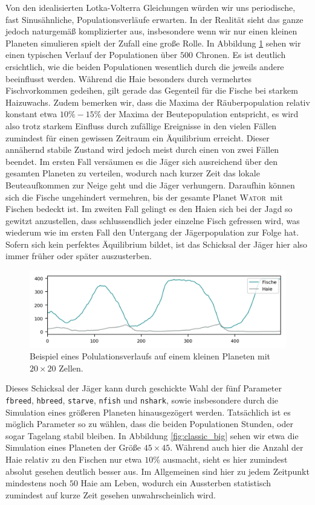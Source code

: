 \documentclass[a4paper,11pt]{article}
\newcommand{\wator}{\textsc{Wator}}
\theoremstyle{definition}
\numberwithin{equation}{section}
\begin{document}
	Von den idealisierten Lotka-Volterra Gleichungen würden wir uns periodische, fast Sinusähnliche, Populationsverläufe erwarten. In der Realität sieht das ganze jedoch naturgemäß komplizierter aus, insbesondere wenn wir nur einen kleinen Planeten simulieren spielt der Zufall eine große Rolle. In Abbildung \ref{fig:classic_default} sehen wir einen typischen Verlauf der Populationen über $500$ Chronen. Es ist deutlich ersichtlich, wie die beiden Populationen wesentlich durch die jeweils andere beeinflusst werden. Während die Haie besonders durch vermehrtes Fischvorkommen gedeihen, gilt gerade das Gegenteil für die Fische bei starkem Haizuwachs. Zudem bemerken wir, dass die Maxima der Räuberpopulation relativ konstant etwa $10\%-15\%$ der Maxima der Beutepopulation entspricht, es wird also trotz starkem Einfluss durch zufällige Ereignisse in den vielen Fällen zumindest für einen gewissen Zeitraum ein Äquilibrium erreicht. Dieser annähernd stabile Zustand wird jedoch meist durch einen von zwei Fällen beendet. Im ersten Fall versäumen es die Jäger sich ausreichend über den gesamten Planeten zu verteilen, wodurch nach kurzer Zeit das lokale Beuteaufkommen zur Neige geht und die Jäger verhungern. Daraufhin können sich die Fische ungehindert vermehren, bis der gesamte Planet \wator\ mit Fischen bedeckt ist. Im zweiten Fall gelingt es den Haien sich bei der Jagd so gewitzt anzustellen, dass schlussendlich jeder einzelne Fisch gefressen wird, was wiederum wie im ersten Fall den Untergang der Jägerpopulation zur Folge hat. Sofern sich kein perfektes Äquilibrium bildet, ist das Schicksal der Jäger hier also immer früher oder später auszusterben. \newline

	\begin{figure}
		\centering
		\includegraphics[width=\textwidth]{pictures/classic_default.png}
		\caption{Beispiel eines Polulationsverlaufs auf einem kleinen Planeten mit $20 \times 20$ Zellen.}
		\label{fig:classic_default}
	\end{figure}

	Dieses Schicksal der Jäger kann durch geschickte Wahl der fünf Parameter \texttt{fbreed}, \texttt{hbreed}, \texttt{starve}, \texttt{nfish} und \texttt{nshark}, sowie insbesondere durch die Simulation eines größeren Planeten hinausgezögert werden. Tatsächlich ist es möglich Parameter so zu wählen, dass die beiden Populationen Stunden, oder sogar Tagelang stabil bleiben. In Abbildung \ref{fig:classic_big} sehen wir etwa die Simulation eines Planeten der Größe $45 \times 45$. Während auch hier die Anzahl der Haie relativ zu den Fischen nur etwa $10\%$ ausmacht, sieht es hier zumindest absolut gesehen deutlich besser aus. Im Allgemeinen sind hier zu jedem Zeitpunkt mindestens noch $50$ Haie am Leben, wodurch ein Aussterben statistisch zumindest auf kurze Zeit gesehen unwahrscheinlich wird.
\end{document}
